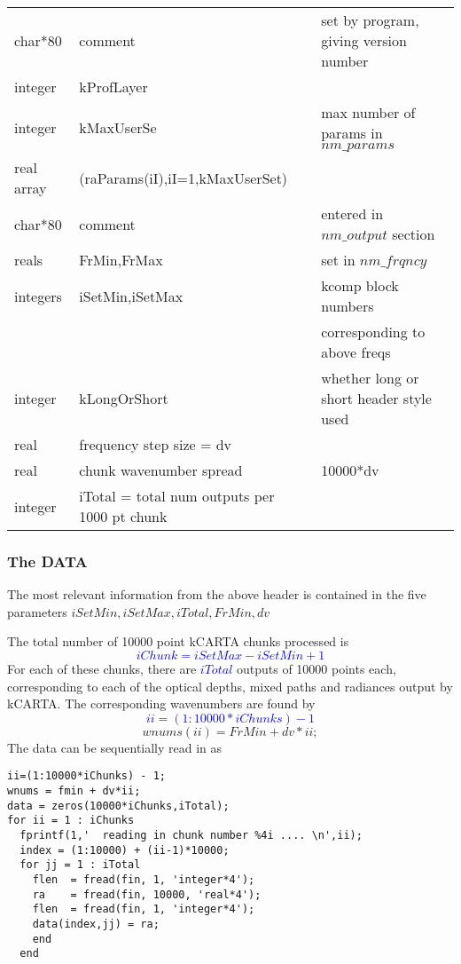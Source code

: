 \documentclass[12pt]{article}
\newcommand{\kc}{\textsf{kCARTA}\xspace}
\newlength{\colwidth}
\begin{document}
{{{\begin{small}
\begin{longtable}{llp{\colwidth}}
{\sf char*80}    & comment & set by program, giving version number\\
{\sf integer}    & kProfLayer & \\
{\sf integer}    & kMaxUserSe & max number of params in $nm\_params$\\
{\sf real array} & (raParams(iI),iI=1,kMaxUserSet) & \\
{\sf char*80}    & comment & entered in $nm\_output$ section\\
{\sf 2 reals}    & FrMin,FrMax &set in $nm\_frqncy$\\
{\sf 2 integers} & iSetMin,iSetMax  & kcomp block numbers \\
                 &                  & corresponding to above freqs \\
{\sf integer}    & kLongOrShort & whether long or short header style used\\
{\sf real}       & frequency step size = dv & \\
{\sf real}       & chunk wavenumber spread  & 10000*dv \\
{\sf integer}    & iTotal = total num outputs per 1000 pt chunk & \\
\end{longtable}
\end{small}

\subsubsection{The DATA}
The most relevant information from the above header is contained in the five
parameters $iSetMin, iSetMax,iTotal, FrMin, dv$

The total number of 10000 point \kc chunks processed is 
\textcolor{blue}
{\[
iChunk = iSetMax-iSetMin+1
\]}
For each of these chunks, there are \textcolor{blue}{$iTotal$} outputs of 10000
points each, corresponding to each of the optical depths, mixed paths and 
radiances output by \kc. The corresponding wavenumbers are found by
\textcolor{blue}
{\[
ii=(1:10000*iChunks) - 1
\]}
{\[
wnums(ii) = FrMin + dv*ii; 
\]}
The data can be sequentially read in as
\begin{verbatim}
ii=(1:10000*iChunks) - 1; 
wnums = fmin + dv*ii; 
data = zeros(10000*iChunks,iTotal); 
for ii = 1 : iChunks 
  fprintf(1,'  reading in chunk number %4i .... \n',ii); 
  index = (1:10000) + (ii-1)*10000; 
  for jj = 1 : iTotal
    flen  = fread(fin, 1, 'integer*4'); 
    ra    = fread(fin, 10000, 'real*4'); 
    flen  = fread(fin, 1, 'integer*4'); 
    data(index,jj) = ra; 
    end 
  end 
\end{verbatim}

}}}
\end{document}
